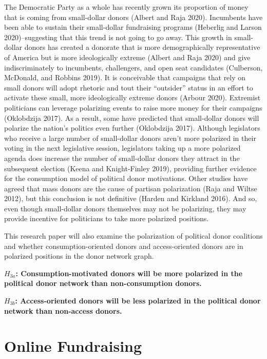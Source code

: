 \documentclass[12pt,]{article}
\begin{document}
The Democratic Party as a whole has recently grown its proportion of
money that is coming from small-dollar donors (Albert and Raja 2020).
Incumbents have been able to sustain their small-dollar fundraising
programs (Heberlig and Larson 2020)--suggesting that this trend is not
going to go away. This growth in small-dollar donors has created a
donorate that is more demographically representative of America but is
more ideologically extreme (Albert and Raja 2020) and give
indiscriminately to incumbents, challengers, and open seat candidates
(Culberson, McDonald, and Robbins 2019). It is conceivable that
campaigns that rely on small donors will adopt rhetoric and tout their
``outsider'' status in an effort to activate these small, more
ideologically extreme donors (Arbour 2020). Extremist politicians can
leverage polarizing events to raise more money for their campaigns
(Oklobdzija 2017). As a result, some have predicted that small-dollar
donors will polarize the nation's politics even further (Oklobdzija
2017). Although legislators who receive a large number of small-dollar
donors aren't more polarized in their voting in the next legislative
session, legislators taking up a more polarized agenda does increase the
number of small-dollar donors they attract in the subsequent election
(Keena and Knight-Finley 2019), providing further evidence for the
consumption model of political donor motivations. Other studies have
agreed that mass donors are the cause of partisan polarization (Raja and
Wiltse 2012), but this conclusion is not definitive (Harden and Kirkland
2016). And so, even though small-dollar donors themselves may not be
polarizing, they may provide incentive for politicians to take more
polarized positions.

This research paper will also examine the polarization of political
donor coalitions and whether consumption-oriented donors and
access-oriented donors are in polarized positions in the donor network
graph.

\textbf{\(H_{3a}\): Consumption-motivated donors will be more polarized
in the political donor network than non-consumption donors.}

\textbf{\(H_{3b}\): Access-oriented donors will be less polarized in the
political donor network than non-access donors.}

\hypertarget{online-fundraising}{%
\section{Online Fundraising}\label{online-fundraising}}
\end{document}
